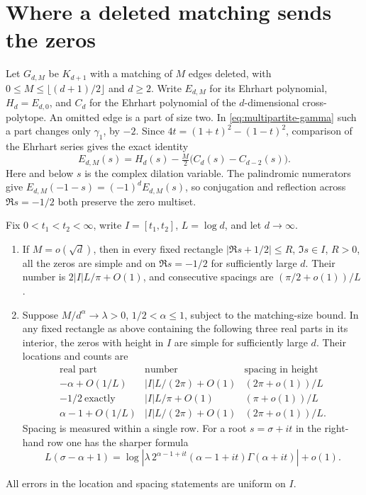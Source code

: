 \section{Where a deleted matching sends the zeros}\label{sec:zeros}
Let $G_{d,M}$ be $K_{d+1}$ with a matching of $M$ edges deleted, with
$0\le M\le\lfloor(d+1)/2\rfloor$ and $d\ge2$. Write $E_{d,M}$ for
its Ehrhart polynomial, $H_d=E_{d,0}$, and $C_d$ for the Ehrhart polynomial
of the $d$-dimensional cross-polytope. An omitted edge is a part of size
two. In \eqref{eq:multipartite-gamma} such a part changes only
$\gamma_1$, by $-2$. Since $4t=(1+t)^2-(1-t)^2$, comparison of the
Ehrhart series gives the exact identity
\begin{equation}\label{eq:matching}
 E_{d,M}(s)=H_d(s)-\tfrac M2\big(C_d(s)-C_{d-2}(s)\big).
\end{equation}
Here and below $s$ is the complex dilation variable. The palindromic
numerators give $E_{d,M}(-1-s)=(-1)^d E_{d,M}(s)$, so conjugation
and reflection across $\Re s=-1/2$ both preserve the zero multiset.

\begin{theorem}\label{thm:strings}
Fix $0<t_1<t_2<\infty$, write $I=[t_1,t_2]$, $L=\log d$, and let
$d\to\infty$.
\begin{enumerate}
\item If $M=o(\sqrt d)$, then in every fixed rectangle
$|\Re s+1/2|\le R$, $\Im s\in I$, $R>0$, all the zeros are simple
and on $\Re s=-1/2$ for sufficiently large $d$. Their number is
$2|I|L/\pi+O(1)$, and consecutive spacings are
$(\pi/2+o(1))/L$.
\item Suppose $M/d^\alpha\to\lambda>0$, $1/2<\alpha\le1$,
subject to the matching-size bound. In any fixed rectangle as above
containing the following three real parts in its interior, the zeros with
height in $I$ are simple for sufficiently large $d$. Their locations
and counts are
\[
\begin{array}{c|c|c}
 \text{real part} & \text{number} & \text{spacing in height}\\ \hline
 -\alpha+O(1/L) & |I|L/(2\pi)+O(1)&(2\pi+o(1))/L\\
 -1/2\ \text{exactly} & |I|L/\pi+O(1)&(\pi+o(1))/L\\
 \alpha-1+O(1/L) & |I|L/(2\pi)+O(1)&(2\pi+o(1))/L .
\end{array}
\]
Spacing is measured within a single row. For a root
$s=\sigma+it$ in the right-hand row one has the sharper formula
\begin{equation}\label{eq:shift}
 L(\sigma-\alpha+1)
 =\log\left|\lambda\,2^{\alpha-1+it}(\alpha-1+it)
               \Gamma(\alpha+it)\right|+o(1).
\end{equation}
\end{enumerate}
All errors in the location and spacing statements are uniform on $I$.
\end{theorem}

